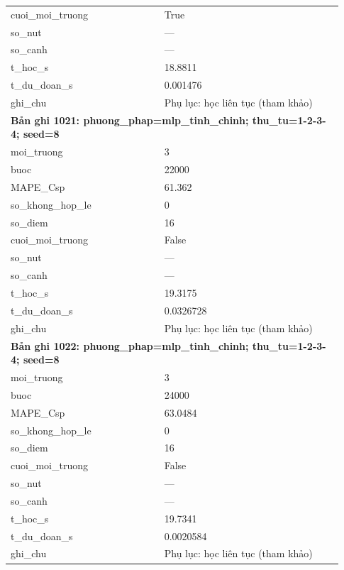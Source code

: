 \begin{longtable}{p{0.43\linewidth}p{0.50\linewidth}}
cuoi\_\allowbreak moi\_\allowbreak truong & True \\
so\_\allowbreak nut & — \\
so\_\allowbreak canh & — \\
t\_\allowbreak hoc\_\allowbreak s & 18.8811 \\
t\_\allowbreak du\_\allowbreak doan\_\allowbreak s & 0.001476 \\
ghi\_\allowbreak chu & Phụ lục: học liên tục (tham khảo) \\
\midrule
\multicolumn{2}{p{0.95\linewidth}}{\textbf{Bản ghi 1021: phuong\_phap=mlp\_tinh\_chinh; thu\_tu=1-2-3-4; seed=8}} \\
moi\_\allowbreak truong & 3 \\
buoc & 22000 \\
MAPE\_\allowbreak Csp & 61.362 \\
so\_\allowbreak khong\_\allowbreak hop\_\allowbreak le & 0 \\
so\_\allowbreak diem & 16 \\
cuoi\_\allowbreak moi\_\allowbreak truong & False \\
so\_\allowbreak nut & — \\
so\_\allowbreak canh & — \\
t\_\allowbreak hoc\_\allowbreak s & 19.3175 \\
t\_\allowbreak du\_\allowbreak doan\_\allowbreak s & 0.0326728 \\
ghi\_\allowbreak chu & Phụ lục: học liên tục (tham khảo) \\
\midrule
\multicolumn{2}{p{0.95\linewidth}}{\textbf{Bản ghi 1022: phuong\_phap=mlp\_tinh\_chinh; thu\_tu=1-2-3-4; seed=8}} \\
moi\_\allowbreak truong & 3 \\
buoc & 24000 \\
MAPE\_\allowbreak Csp & 63.0484 \\
so\_\allowbreak khong\_\allowbreak hop\_\allowbreak le & 0 \\
so\_\allowbreak diem & 16 \\
cuoi\_\allowbreak moi\_\allowbreak truong & False \\
so\_\allowbreak nut & — \\
so\_\allowbreak canh & — \\
t\_\allowbreak hoc\_\allowbreak s & 19.7341 \\
t\_\allowbreak du\_\allowbreak doan\_\allowbreak s & 0.0020584 \\
ghi\_\allowbreak chu & Phụ lục: học liên tục (tham khảo) \\

\end{longtable}
